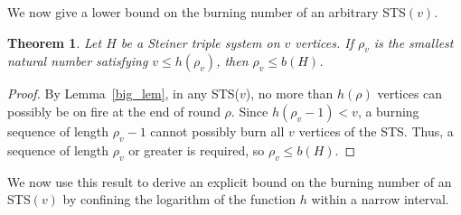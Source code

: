 \documentclass[12pt]{article}
\newtheorem{theorem}{Theorem}[section]
\theoremstyle{definition}
\numberwithin{table}{section}
\newcommand{\round}{{\rho}}
\begin{document}
We now give a lower bound on the burning number of an arbitrary STS$(v)$.

\begin{theorem}
\label{small_lem}
Let $H$ be a Steiner triple system on $v$ vertices. 
If $\round_v$ is the smallest natural number satisfying $v\leq h(\round_v)$, then $\round_v \leq b(H)$. 
\end{theorem}

\begin{proof}
By Lemma~\ref{big_lem}, in any STS($v$), no more than $h(\round)$ vertices can possibly be on fire at the end of round $\round$. Since $h(\round_v -1)<v$, a burning sequence of length $\round_v -1$ cannot possibly burn all $v$ vertices of the STS. Thus, a sequence of length $\round_v$ or greater is required, so $\round_v\leq b(H)$.
\end{proof}

We now use this result to derive an explicit bound on the burning number of an STS$(v)$ by confining the logarithm of the function $h$ within a narrow interval.  
\end{document}
